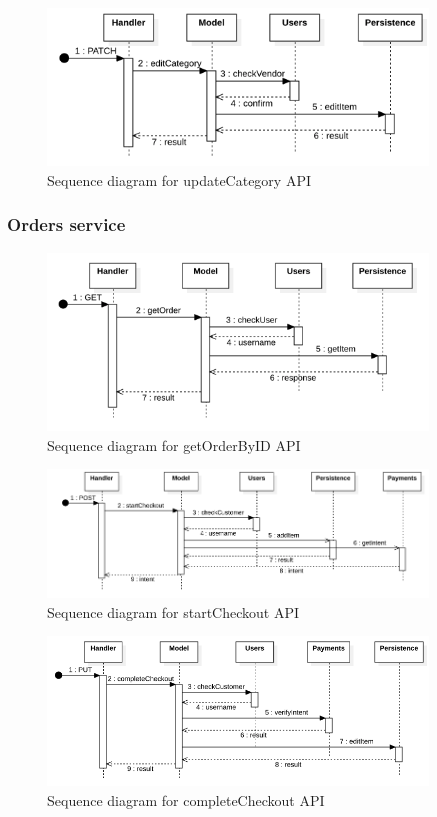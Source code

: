\begin{figure}[H]
    \includegraphics[width=0.9\textwidth]{res/images/sequence-diagrams/categories/updateCategory.png}
    \caption{Sequence diagram for updateCategory API}
\end{figure}

\subsubsection{Orders service}
\begin{figure}[H]
    \includegraphics[width=0.9\textwidth]{res/images/sequence-diagrams/orders/getOrderByID.png}
    \caption{Sequence diagram for getOrderByID API}
\end{figure}

\begin{figure}[H]
    \includegraphics[width=0.9\textwidth]{res/images/sequence-diagrams/orders/startCheckout.png}
    \caption{Sequence diagram for startCheckout API}
\end{figure}

\begin{figure}[H]
    \includegraphics[width=0.9\textwidth]{res/images/sequence-diagrams/orders/completeCheckout.png}
    \caption{Sequence diagram for completeCheckout API}
\end{figure}

